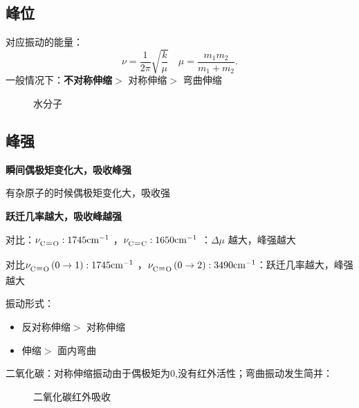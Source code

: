 \subsection{峰位}%
\label{sub:峰位}
对应振动的能量：\[
    \nu = \frac{1}{2\pi }\sqrt{\frac{k}{\mu}}\quad \mu = \frac{m_1m_2}{m_1+m_2}
.\]
一般情况下：\textbf{不对称伸缩}$>$ 对称伸缩$>$ 弯曲伸缩
\begin{eg}
\begin{figure}[ht!]
    \centering
    \caption{水分子}
    \label{fig:水分子}
\end{figure}
\end{eg}
\subsection{峰强}%
\label{sub:峰强}
\textbf{瞬间偶极矩变化大，吸收峰强}
\begin{eg}
    有杂原子的时候偶极矩变化大，吸收强
\end{eg}
\textbf{跃迁几率越大，吸收峰越强}
\begin{eg}
    对比：$\nu_{\ce{C=O}}: 1745\text{cm}^{-1}$ ，$\nu_{\ce{C=C}}: 1650\text{cm}^{-1}$ ：$\Delta\mu$ 越大，峰强越大

    对比$\nu_{\ce{C=O}}\left( 0\to 1 \right): 1745\text{cm}^{-1}$ ，$\nu_{\ce{C=O}}\left( 0\to 2 \right): 3490\text{cm}^{-1}$：跃迁几率越大，峰强越大
\end{eg}
\begin{notation}
    振动形式：
    \begin{itemize}
        \item 反对称伸缩$>$ 对称伸缩
        \item 伸缩$>$ 面内弯曲
    \end{itemize}
\end{notation}
\begin{eg}
    二氧化碳：对称伸缩振动由于偶极矩为0,没有红外活性；弯曲振动发生简并：
\begin{figure}[ht!]
    \centering
    \caption{二氧化碳红外吸收}
    \label{fig:二氧化碳红外吸收}
\end{figure}
\end{eg}
